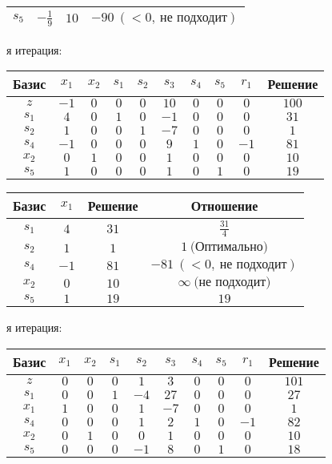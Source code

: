\documentclass{article}%
\begin{document}
\begin{flushleft}
\begin{tabular}{|cccc|}
$s_{5}$&$-\frac{1}{9}$&$10$&$-90\: (< 0, \: \text{не подходит})$\\%
\hline%
\end{tabular}%
\newline%
\newline%
я итерация: %
\newline%
\newline%
\renewcommand{\arraystretch}{1.3}%
\begin{tabular}{|c|cccccccc|c|}%
\hline%
Базис&$x_{1}$&$x_{2}$&$s_{1}$&$s_{2}$&$s_{3}$&$s_{4}$&$s_{5}$&$r_{1}$&Решение\\%
\hline%
$z$&$-1$&$0$&$0$&$0$&$10$&$0$&$0$&$0$&$100$\\%
\hline%
$s_{1}$&$4$&$0$&$1$&$0$&$-1$&$0$&$0$&$0$&$31$\\%
$s_{2}$&$1$&$0$&$0$&$1$&$-7$&$0$&$0$&$0$&$1$\\%
$s_{4}$&$-1$&$0$&$0$&$0$&$9$&$1$&$0$&$-1$&$81$\\%
$x_{2}$&$0$&$1$&$0$&$0$&$1$&$0$&$0$&$0$&$10$\\%
$s_{5}$&$1$&$0$&$0$&$0$&$1$&$0$&$1$&$0$&$19$\\%
\hline%
\end{tabular}%
\newline%
\newline%
\newline%
\begin{tabular}{|cccc|}%
\hline%
Базис&$x_{1}$&Решение&Отношение\\%
\hline%
$s_{1}$&$4$&$31$&$\frac{31}{4}$\\%
$s_{2}$&$1$&$1$&$1\: \text{(Оптимально)}$\\%
$s_{4}$&$-1$&$81$&$-81\: (< 0, \: \text{не подходит})$\\%
$x_{2}$&$0$&$10$&$\infty \: \text{(не подходит)}$\\%
$s_{5}$&$1$&$19$&$19$\\%
\hline%
\end{tabular}%
\newline%
\newline%
я итерация: %
\newline%
\newline%
\renewcommand{\arraystretch}{1.3}%
\begin{tabular}{|c|cccccccc|c|}%
\hline%
Базис&$x_{1}$&$x_{2}$&$s_{1}$&$s_{2}$&$s_{3}$&$s_{4}$&$s_{5}$&$r_{1}$&Решение\\%
\hline%
$z$&$0$&$0$&$0$&$1$&$3$&$0$&$0$&$0$&$101$\\%
\hline%
$s_{1}$&$0$&$0$&$1$&$-4$&$27$&$0$&$0$&$0$&$27$\\%
$x_{1}$&$1$&$0$&$0$&$1$&$-7$&$0$&$0$&$0$&$1$\\%
$s_{4}$&$0$&$0$&$0$&$1$&$2$&$1$&$0$&$-1$&$82$\\%
$x_{2}$&$0$&$1$&$0$&$0$&$1$&$0$&$0$&$0$&$10$\\%
$s_{5}$&$0$&$0$&$0$&$-1$&$8$&$0$&$1$&$0$&$18$\\%
\hline%
\end{tabular}%
\newline%
\end{flushleft}%
\end{document}
